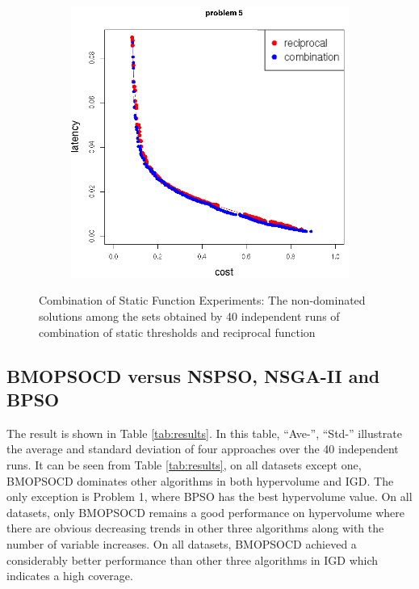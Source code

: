 \begin{figure}[h!]
\begin{subfigure}{0.49\textwidth}
	   \caption{}
   \end{subfigure}
   \begin{subfigure}{0.49\textwidth}
       \includegraphics[width=\textwidth]{pics/combination_problem5.png}
	   \caption{}
   \end{subfigure}
   \caption{Combination of Static Function Experiments:  The non-dominated solutions among
the sets obtained by 40 independent runs of combination of static thresholds and reciprocal
function}
   \label{fig:combination}
\end{figure}



\subsection{BMOPSOCD versus NSPSO, NSGA-II and BPSO}
The result is shown in Table \ref{tab:results}. In this table, ``Ave-'', ``Std-'' illustrate the average and standard deviation 
of four approaches over the 40 independent runs.
It can be seen from Table \ref{tab:results}, on all datasets except one, BMOPSOCD dominates other algorithms in both hypervolume and IGD. The only exception
is Problem 1, where BPSO has the best hypervolume value. On all datasets, only BMOPSOCD remains a good performance on hypervolume where there are obvious decreasing
trends in other three algorithms along with the number of variable increases. On all datasets, BMOPSOCD achieved a considerably better performance than other three
algorithms in IGD which indicates a high coverage.

